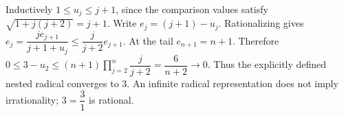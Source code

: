 Inductively $1\le u_j\le j+1$, since the comparison values satisfy $\sqrt{1+j(j+2)}=j+1$. Write $e_j=(j+1)-u_j$. Rationalizing gives $e_j=\dfrac{j e_{j+1}}{j+1+u_j}\le\dfrac{j}{j+2}e_{j+1}$. At the tail $e_{n+1}=n+1$. Therefore $0\le3-u_2\le(n+1)\prod_{j=2}^n\dfrac{j}{j+2}=\dfrac{6}{n+2}\to0$. Thus the explicitly defined nested radical converges to 3. An infinite radical representation does not imply irrationality; $3=\dfrac{3}{1}$ is rational.
